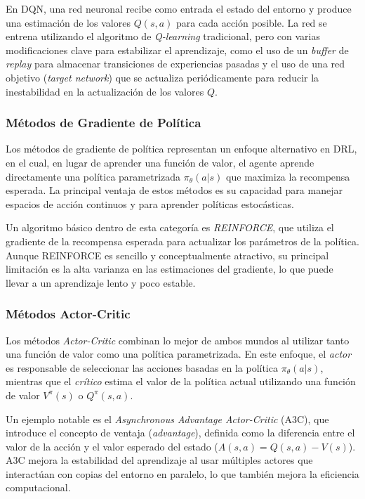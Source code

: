 \documentclass[a4paper,12pt, twoside]{report}
\begin{document}
En DQN, una red neuronal recibe como entrada el estado del entorno y produce una estimación 
de los valores \(Q(s, a)\) para cada acción posible. La red se entrena utilizando el 
algoritmo de \textit{Q-learning} tradicional, pero con varias modificaciones clave para 
estabilizar el aprendizaje, como el uso de un \textit{buffer} de \textit{replay} para 
almacenar transiciones de experiencias pasadas y el uso de una red objetivo 
(\textit{target network}) que se actualiza periódicamente para reducir la inestabilidad 
en la actualización de los valores \(Q\).

\subsubsection{Métodos de Gradiente de Política}

Los métodos de gradiente de política representan un enfoque alternativo en DRL, en el cual, 
en lugar de aprender una función de valor, el agente aprende directamente una política 
parametrizada \(\pi_{\theta}(a|s)\) que maximiza la recompensa esperada. La principal 
ventaja de estos métodos es su capacidad para manejar espacios de acción continuos y 
para aprender políticas estocásticas.

Un algoritmo básico dentro de esta categoría es \textit{REINFORCE}, que utiliza el gradiente 
de la recompensa esperada para actualizar los parámetros de la política. Aunque REINFORCE es 
sencillo y conceptualmente atractivo, su principal limitación es la alta varianza en las 
estimaciones del gradiente, lo que puede llevar a un aprendizaje lento y poco estable.

\subsubsection{Métodos Actor-Critic}

Los métodos \textit{Actor-Critic} combinan lo mejor de ambos mundos al utilizar tanto una 
función de valor como una política parametrizada. En este enfoque, el \textit{actor} es 
responsable de seleccionar las acciones basadas en la política \(\pi_{\theta}(a|s)\), mientras 
que el \textit{crítico} estima el valor de la política actual utilizando una función de valor 
\(V^{\pi}(s)\) o \(Q^{\pi}(s, a)\).

Un ejemplo notable es el \textit{Asynchronous Advantage Actor-Critic} (A3C), que introduce 
el concepto de ventaja (\textit{advantage}), definida como la diferencia entre el valor de 
la acción y el valor esperado del estado (\(A(s, a) = Q(s, a) - V(s)\)). A3C mejora la 
estabilidad del aprendizaje al usar múltiples actores que interactúan con copias del entorno 
en paralelo, lo que también mejora la eficiencia computacional.
\end{document}
